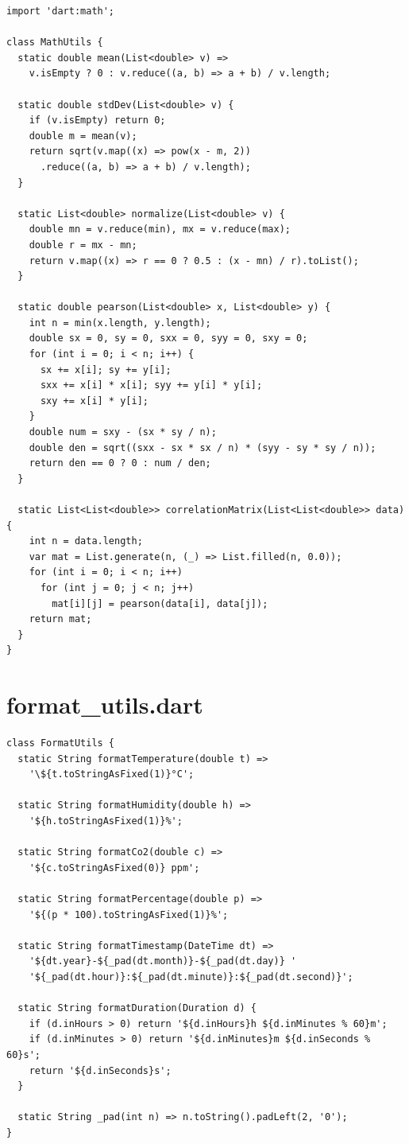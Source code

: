 \documentclass[12pt,a4paper,oneside]{report}
\begin{document}
\begin{lstlisting}[style=dartstyle]
import 'dart:math';

class MathUtils {
  static double mean(List<double> v) =>
    v.isEmpty ? 0 : v.reduce((a, b) => a + b) / v.length;

  static double stdDev(List<double> v) {
    if (v.isEmpty) return 0;
    double m = mean(v);
    return sqrt(v.map((x) => pow(x - m, 2))
      .reduce((a, b) => a + b) / v.length);
  }

  static List<double> normalize(List<double> v) {
    double mn = v.reduce(min), mx = v.reduce(max);
    double r = mx - mn;
    return v.map((x) => r == 0 ? 0.5 : (x - mn) / r).toList();
  }

  static double pearson(List<double> x, List<double> y) {
    int n = min(x.length, y.length);
    double sx = 0, sy = 0, sxx = 0, syy = 0, sxy = 0;
    for (int i = 0; i < n; i++) {
      sx += x[i]; sy += y[i];
      sxx += x[i] * x[i]; syy += y[i] * y[i];
      sxy += x[i] * y[i];
    }
    double num = sxy - (sx * sy / n);
    double den = sqrt((sxx - sx * sx / n) * (syy - sy * sy / n));
    return den == 0 ? 0 : num / den;
  }

  static List<List<double>> correlationMatrix(List<List<double>> data) {
    int n = data.length;
    var mat = List.generate(n, (_) => List.filled(n, 0.0));
    for (int i = 0; i < n; i++)
      for (int j = 0; j < n; j++)
        mat[i][j] = pearson(data[i], data[j]);
    return mat;
  }
}
\end{lstlisting}

\section{format\_utils.dart}

\begin{lstlisting}[style=dartstyle]
class FormatUtils {
  static String formatTemperature(double t) =>
    '\${t.toStringAsFixed(1)}°C';

  static String formatHumidity(double h) =>
    '${h.toStringAsFixed(1)}%';

  static String formatCo2(double c) =>
    '${c.toStringAsFixed(0)} ppm';

  static String formatPercentage(double p) =>
    '${(p * 100).toStringAsFixed(1)}%';

  static String formatTimestamp(DateTime dt) =>
    '${dt.year}-${_pad(dt.month)}-${_pad(dt.day)} '
    '${_pad(dt.hour)}:${_pad(dt.minute)}:${_pad(dt.second)}';

  static String formatDuration(Duration d) {
    if (d.inHours > 0) return '${d.inHours}h ${d.inMinutes % 60}m';
    if (d.inMinutes > 0) return '${d.inMinutes}m ${d.inSeconds % 60}s';
    return '${d.inSeconds}s';
  }

  static String _pad(int n) => n.toString().padLeft(2, '0');
}
\end{lstlisting}
\end{document}
